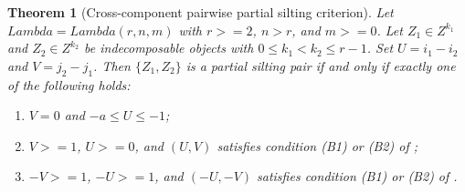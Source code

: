 \documentclass[11pt, a4paper]{article}
\newtheorem{theorem}{Theorem}[section]
\theoremstyle{definition}
\def\Lambda{Lambda}%
\def\ge{>=}%
\def\mathcal#1{#1}%
\begin{document}
\begin{theorem}[Cross-component pairwise partial silting criterion]\label{thm:cross-pairwise}
Let $\Lambda = \Lambda(r,n,m)$ with $r \ge 2$, $n>r$, and $m\ge0$. Let $Z_1 \in \mathcal Z^{k_1}$ and $Z_2 \in \mathcal Z^{k_2}$ be indecomposable objects with $0 \le k_1 < k_2 \le r-1$. Set $U = i_1 - i_2$ and $V = j_2 - j_1$. Then $\{Z_1, Z_2\}$ is a partial silting pair if and only if exactly one of the following holds:
\begin{enumerate}[label=\textup{(\roman*)}]
    \item $V = 0$ and $-a \le U \le -1$;
    \item $V \ge 1$, $U \ge 0$, and $(U,V)$ satisfies condition \textup{(B1)} or \textup{(B2)} of ;
    \item $-V \ge 1$, $-U \ge 1$, and $(-U,-V)$ satisfies condition \textup{(B1)} or \textup{(B2)} of .
\end{enumerate}
\end{theorem}
\end{document}

